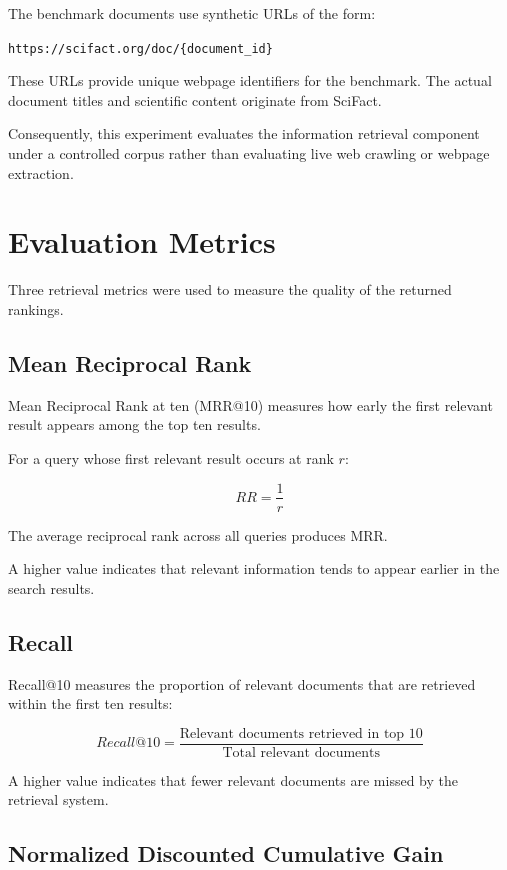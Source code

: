 \documentclass{tietreport}
\begin{document}
The benchmark documents use synthetic URLs of the form:

\begin{center}
\texttt{https://scifact.org/doc/\{document\_id\}}
\end{center}

These URLs provide unique webpage identifiers for the benchmark.
The actual document titles and scientific content originate
from SciFact.

Consequently, this experiment evaluates the information
retrieval component under a controlled corpus rather than
evaluating live web crawling or webpage extraction.

\section{Evaluation Metrics}

Three retrieval metrics were used to measure the quality of
the returned rankings.

\subsection{Mean Reciprocal Rank}

Mean Reciprocal Rank at ten (MRR@10) measures how early the
first relevant result appears among the top ten results.

For a query whose first relevant result occurs at rank $r$:

\[
RR = \frac{1}{r}
\]

The average reciprocal rank across all queries produces MRR.

A higher value indicates that relevant information tends to
appear earlier in the search results.

\subsection{Recall}

Recall@10 measures the proportion of relevant documents that
are retrieved within the first ten results:

\[
Recall@10 =
\frac{\text{Relevant documents retrieved in top 10}}
{\text{Total relevant documents}}
\]

A higher value indicates that fewer relevant documents are
missed by the retrieval system.

\subsection{Normalized Discounted Cumulative Gain}
\end{document}
